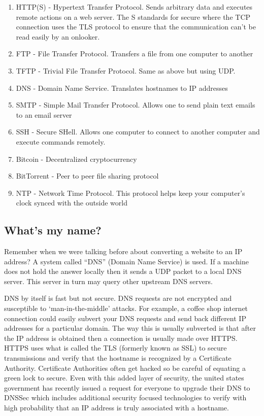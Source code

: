 \begin{enumerate}
  \item HTTP(S) - Hypertext Transfer Protocol.
    Sends arbitrary data and executes remote actions on a web server.
    The S standards for secure where the TCP connection uses the TLS protocol to ensure that the communication can't be read easily by an onlooker.
  \item FTP - File Transfer Protocol.
    Transfers a file from one computer to another
  \item TFTP - Trivial File Transfer Protocol.
    Same as above but using UDP.
  \item DNS - Domain Name Service.
    Translates hostnames to IP addresses
  \item SMTP - Simple Mail Transfer Protocol.
    Allows one to send plain text emails to an email server
  \item SSH - Secure SHell.
    Allows one computer to connect to another computer and execute commands remotely.
  \item Bitcoin - Decentralized cryptocurrency
  \item BitTorrent - Peer to peer file sharing protocol
  \item NTP - Network Time Protocol.
    This protocol helps keep your computer's clock synced with the outside world
\end{enumerate}

\subsection{What's my name?}

Remember when we were talking before about converting a website to an IP address?
A system called ``DNS'' (Domain Name Service) is used.
If a machine does not hold the answer locally then it sends a UDP packet to a local DNS server.
This server in turn may query other upstream DNS servers.

DNS by itself is fast but not secure.
DNS requests are not encrypted and susceptible to `man-in-the-middle' attacks.
For example, a coffee shop internet connection could easily subvert your DNS requests and send back different IP addresses for a particular domain.
The way this is usually subverted is that after the IP address is obtained then a connection is usually made over HTTPS.
HTTPS uses what is called the TLS (formerly known as SSL) to secure transmissions and verify that the hostname is recognized by a Certificate Authority.
Certificate Authorities often get hacked so be careful of equating a green lock to secure.
Even with this added layer of security, the united states government has recently issued a request for everyone to upgrade their DNS to DNSSec which includes additional security focused technologies to verify with high probability that an IP address is truly associated with a hostname.

